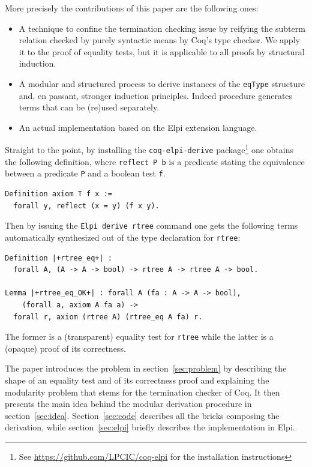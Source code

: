 \documentclass[sigplan,10pt,review]{acmart}\settopmatter{printfolios=true,printccs=false,printacmref=false}
\begin{document}
More precisely the contributions of this paper are the following ones:
\begin{itemize}
\item A technique to confine the termination checking
	issue by reifying the subterm relation checked by purely syntactic
	means by Coq's type checker. We apply it to the proof of equality
	tests, but it is applicable to all proofs by structural
	induction.

\item A modular and structured process to derive instances of the
	\lstinline+eqType+ structure and, en passant, stronger
	induction principles. Indeed procedure generates
	terms that can be (re)used separately.

\item An actual implementation based on the Elpi extension language.
\end{itemize}

\noindent
Straight to the point, by installing the \lstinline+coq-elpi-derive+
package\footnote{See \url{https://github.com/LPCIC/coq-elpi} for the
installation instructions} 
one obtains the following definition, where \lstinline+reflect P b+
is a predicate stating the equivalence between a predicate
\lstinline+P+ and a boolean test \lstinline+f+.

\begin{lstlisting}
Definition axiom T f x :=
  forall y, reflect (x = y) (f x y).
\end{lstlisting}

\noindent
Then by issuing the \lstinline+Elpi derive rtree+ command one gets
the following terms automatically synthesized out of the type
declaration for \lstinline+rtree+:

\begin{lstlisting}
Definition |+rtree_eq+| :
  forall A, (A -> A -> bool) -> rtree A -> rtree A -> bool.

Lemma |+rtree_eq_OK+| : forall A (fa : A -> A -> bool),
    (forall a, axiom A fa a) ->
  forall r, axiom (rtree A) (rtree_eq A fa) r.
\end{lstlisting}

\noindent
The former is a (transparent) equality test for \lstinline+rtree+
while the latter is a (opaque) proof of its correctness.

The paper introduces the problem in
section~\ref{sec:problem} by describing the shape of an equality test
and of its correctness proof and explaining the modularity problem
that stems for the termination checker of Coq. It then
presents the main idea behind the
modular derivation procedure in section~\ref{sec:idea}.
Section~\ref{sec:code} describes all the bricks composing the
derivation, while section~\ref{sec:elpi} briefly describes the
implementation in Elpi.
\end{document}

